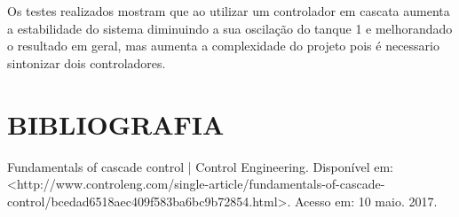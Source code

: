 \documentclass[a4paper,12pt]{article}
\begin{document}
\hspace{4ex}Os testes realizados mostram que ao utilizar um controlador em cascata aumenta a estabilidade do sistema diminuindo a sua oscilação do tanque 1 e melhorandado o resultado em geral, mas aumenta a complexidade do projeto pois é necessario sintonizar dois controladores.

\newpage

\thispagestyle{empty}
\section{BIBLIOGRAFIA}

Fundamentals of cascade control | Control Engineering. Disponível em: <http://www.controleng.com/single-article/fundamentals-of-cascade-control/bcedad6518aec409f583ba6bc9b72854.html>. Acesso em: 10 maio. 2017.





%


%
\end{document}
